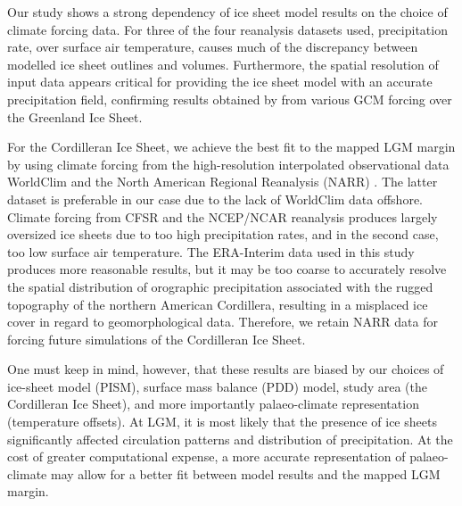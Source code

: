 \conclusions
\label{sec:concl}

Our study shows a strong dependency of ice sheet model results on the choice of climate forcing data. For three of the four reanalysis datasets used, precipitation rate, over surface air temperature, causes much of the discrepancy between modelled ice sheet outlines and volumes. Furthermore, the spatial resolution of input data appears critical for providing the ice sheet model with an accurate precipitation field, confirming results obtained by \citet{quiquet-etal-2012} from various GCM forcing over the Greenland Ice Sheet.

For the Cordilleran Ice Sheet, we achieve the best fit to the mapped LGM margin by \citet{dyke-2004} using climate forcing from the high-resolution interpolated observational data WorldClim \citep{data:worldclim} and the North American Regional Reanalysis (NARR) \citep{data:narr}. The latter dataset is preferable in our case due to the lack of WorldClim data offshore. Climate forcing from CFSR and the NCEP/NCAR reanalysis produces largely oversized ice sheets due to too high precipitation rates, and in the second case, too low surface air temperature. The ERA-Interim data used in this study produces more reasonable results, but it may be too coarse to accurately resolve the spatial distribution of orographic precipitation associated with the rugged topography of the northern American Cordillera, resulting in a misplaced ice cover in regard to geomorphological data. Therefore, we retain NARR data for forcing future simulations of the Cordilleran Ice Sheet.

One must keep in mind, however, that these results are biased by our choices of ice-sheet model (PISM), surface mass balance (PDD) model, study area (the Cordilleran Ice Sheet), and more importantly palaeo-climate representation (temperature offsets). At LGM, it is most likely that the presence of ice sheets significantly affected circulation patterns and distribution of precipitation. At the cost of greater computational expense, a more accurate representation of palaeo-climate may allow for a better fit between model results and the mapped LGM margin.

